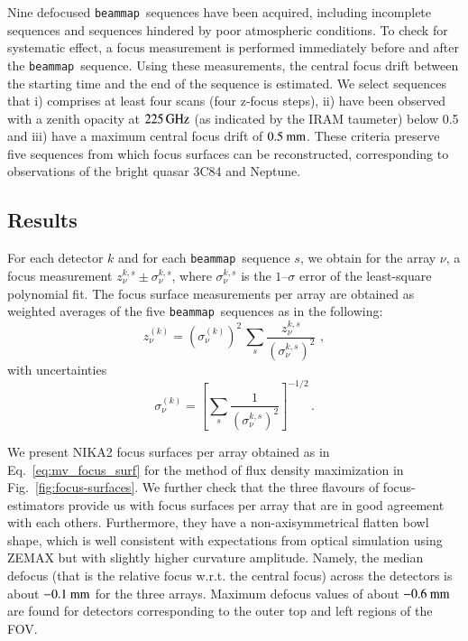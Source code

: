 \documentclass[traditionalabstract]{aa}
\newcommand{\bm}{{\tt beammap}}
\newcommand{\taumeter}{taumeter}
\begin{document}
\begin{appendix}
Nine defocused \bm\ sequences have been acquired, including incomplete
sequences and sequences hindered by poor atmospheric conditions. To
check for systematic effect, a focus measurement is performed
immediately before and after the \bm\ sequence. Using these
measurements, the central focus drift between the starting time and the
end of the sequence is estimated. 
We select sequences that i) comprises at least four scans (four
z-focus steps), ii) have been observed with a zenith opacity at $225\,\rm{GHz}$ (as indicated by
the IRAM \taumeter) below 0.5 and iii) have a maximum central focus
drift of $0.5~\rm{mm}$. These criteria preserve five sequences from which focus
surfaces can be reconstructed, %
corresponding to observations of the bright quasar 3C84 and Neptune.

\subsection{Results}
For each detector $k$ and for each \bm\ sequence $s$, we obtain for
the array $\nu$, a focus measurement $z_\nu^{k, s} \pm \sigma_\nu^{k, s}$,
where $\sigma_\nu^{k, s}$ is the $1\mbox{--}\sigma$ error of the least-square
polynomial fit. The focus surface measurements per array are obtained
as weighted averages of the five \bm\ sequences as in the
following:
%
\begin{equation}
\label{eq:mv_focus_surf}
z_\nu^{(k)} = \left( \sigma_\nu^{(k)} \right)^2 \,  \sum_s \frac{z_\nu^{k,s}}{\left(\sigma_\nu^{k,s}\right)^2}\, \,  ,
\end{equation}
with uncertainties 
\begin{equation}
\label{eq:error_mv_focus_surf}
\sigma_\nu^{(k)} = \left[ \sum_s \frac{1}{\left(\sigma_\nu^{k,s}\right)^2}\right]^{-1/2}\, .
\end{equation}


We present NIKA2 focus surfaces per array obtained as in
Eq.~\ref{eq:mv_focus_surf} for the method of flux density maximization  
in Fig.~\ref{fig:focus-surfaces}.
We further check that the three flavours of focus-estimators provide
us with focus surfaces per array that are in good agreement with each
others. Furthermore, they have a non-axisymmetrical flatten bowl
shape, which is well consistent with expectations from optical
simulation using ZEMAX but with slightly higher curvature amplitude.
Namely, the median defocus (that is the relative focus w.r.t. the
central focus) across the detectors is about
$-0.1~\rm{mm}$ for the three arrays. Maximum defocus values of about
$-0.6~\rm{mm}$ are found for detectors corresponding to the outer top and
left regions of the FOV.


\end{appendix}
\end{document}
